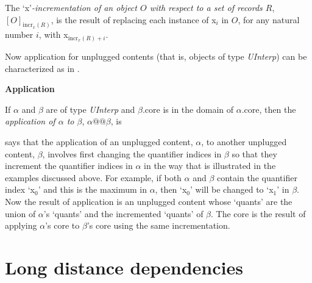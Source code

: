 \begin{ex} 
The `x'\textit{-incrementation of an object $O$ with respect
  to a set of records $R$}, $[O]_{\mathrm{incr}_x(R)}$, is the result of
replacing each instance of x$_i$ in $O$, for any natural number $i$,
with x$_{\mathrm{incr}_x(R)+i}$.  
\end{ex} 
Now application for unplugged contents (that is, objects of type
\textit{UInterp}) can be characterized as in \nexteg{}.

\begin{ex} 
\textbf{Application}

If $\alpha$ and $\beta$ are of type \textit{UInterp} and $\beta$.core
is in the domain of $\alpha$.core, then the \textit{application of
  $\alpha$ to $\beta$}, $\alpha @@\beta$, is
\begin{quote}

\end{quote}
\end{ex} 
\preveg{} says that the application of an unplugged content, $\alpha$,
to another unplugged content, $\beta$, involves first changing the
quantifier indices in $\beta$ so that they increment the quantifier
indices in $\alpha$ in the way that is illustrated in the examples
discussed above.  For example, if both $\alpha$ and $\beta$ contain
the quantifier index `x$_0$' and this is the maximum in $\alpha$, then
`x$_0$' will be changed to `x$_1$' in $\beta$.  Now the result of
application is an unplugged content whose `quants' are the union of
$\alpha$'s `quants' and the incremented `quants' of $\beta$.  The core
is the result of applying $\alpha$'s core to $\beta$'s core using the
same incrementation. 
  


\section{Long distance dependencies}

